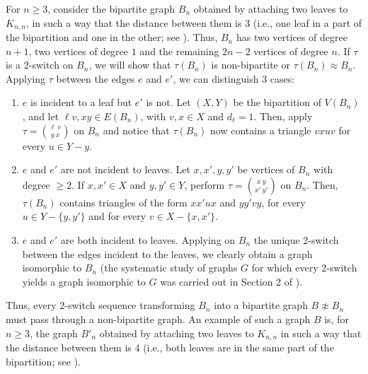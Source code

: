 \documentclass{BICA}
\begin{document}
For $n\geq 3$, consider the bipartite graph $B_n$ obtained by attaching two leaves to $K_{n,n}$, in such a way that the distance between them is 3 (i.e., one leaf in a part of the bipartition and one in the other; see ). Thus, $B_n$ has two vertices of degree $n+1$, two vertices of degree $1$ and the remaining $2n-2$ vertices of degree $n$. If $\tau$ is a 2-switch on $B_n$, we will show that $\tau(B_n )$ is non-bipartite or $\tau(B_n )\approx B_n$. Applying $\tau$ between the edges $e$ and $e'$, we can distinguish 3 cases:
\begin{enumerate}[label=(\arabic*).]
	\item $e$ is incident to a leaf but $e'$ is not. Let $(X,Y)$ be the bipartition of $V(B_n)$, and let $\ell v, xy\in E(B_n)$, with $v,x\in X$ and $d_{\ell}=1$. Then, apply $\tau={{\ell \ v}\choose{y \ x}}$ on $B_n$ and notice that $\tau(B_n)$ now contains a triangle $vxuv$ for every $u\in Y-y$.

	\item $e$ and $e'$ are not incident to leaves. Let $x,x',y,y'$ be vertices of $B_n$ with degree $\geq 2$. If $x,x'\in X$ and $y,y'\in Y$, perform $\tau={{x \ y}\choose{x' \ y'}}$ on $B_n$. Then, $\tau(B_n)$ contains triangles of the form $xx'ux$ and $yy'vy$, for every $u\in Y-\{y,y'\}$ and for every $v\in X-\{x,x'\}$.

	\item $e$ and $e'$ are both incident to leaves. Applying on $B_n$ the unique 2-switch between the edges incident to the leaves, we clearly obtain a graph isomorphic to $B_n$ (the systematic study of graphs $G$ for which every 2-switch yields a graph isomorphic to $G$ was carried out in Section 2 of \cite{BrualdiFernandesFurtado2019}).
\end{enumerate}
Thus, every 2-switch sequence transforming $B_n$ into a bipartite graph $B\not\approx B_n$ must pass through a non-bipartite graph. An example of such a graph $B$ is, for $n\geq 3$, the graph $B'_n$ obtained by attaching two leaves to $K_{n,n}$ in such a way that the distance between them is 4 (i.e., both leaves are in the same part of the bipartition; see ).
\end{document}
